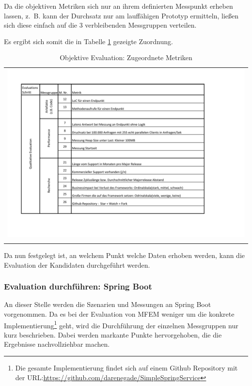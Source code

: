 Da die objektiven Metriken sich nur an ihrem definierten Messpunkt erheben lassen, z.~B. kann der Durchsatz nur am lauffähigen Prototyp ermitteln, ließen sich diese einfach auf die 3 verbleibenden Messgruppen verteilen. 

Es ergibt sich somit die in Tabelle \ref{ObjekEvalMetriken} gezeigte Zuordnung. 

\begin{longtable}{c}
	\includegraphics[width=\linewidth]{Bilder/ObjekEvalMetriken.pdf} \\	
	\caption[Metriken Objektive Evaluation]{Objektive Evaluation: Zugeordnete Metriken}
	\label{ObjekEvalMetriken}\\
\end{longtable}
\FloatBarrier

Da nun festgelegt ist, an welchem Punkt welche Daten erhoben werden, kann die Evaluation der Kandidaten durchgeführt werden.

\subsubsection{Evaluation durchführen: Spring Boot}

An dieser Stelle werden die Szenarien und Messungen an Spring Boot vorgenommen. Da es bei der Evaluation von \ac{MFEM} weniger um die konkrete Implementierung\footnote{
	Die gesamte Implementierung findet sich auf einem Github Repository mit der URL:\url{https://github.com/darenegade/SimpleSpringService}
} 
 geht, wird die Durchführung der einzelnen Messgruppen nur kurz beschrieben. Dabei werden markante Punkte hervorgehoben, die die Ergebnisse nachvollziehbar machen. 

